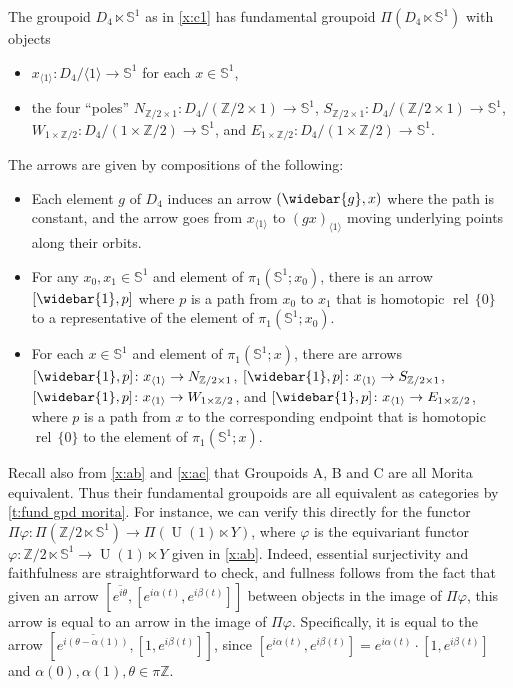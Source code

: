 \documentclass[12pt,reqno]{amsart}
\newcommand{\printname}[1]{}
\renewcommand{\printname}[1]
	{{\color{brown}{\makebox[0pt]{\hspace{-1in}\raisebox{8pt}{\tiny #1}}}}}
\newcommand{\labell}[1]{\label{#1} \printname{#1}}
\renewcommand{\SS}{{\mathbb{S}}} %
\newcommand{\ZZ}{{\mathbb{Z}}}  %
\newcommand{\rel}{{\operatorname{rel}}} %
\newcommand{\U}{{\operatorname{U}}}  %
\theoremstyle{plain}
\theoremstyle{definition}
\newenvironment{example}
		{\pushQED{\qed}\renewcommand{\qedsymbol}{$/\!\!/$}\examplex}
		{\popQED\endexamplex}
\begin{document}
    \begin{example}[{\bf Groupoid C}]\labell{x:c2}
        The groupoid $D_4\ltimes\SS^1$ as in \cref{x:c1} has fundamental groupoid $\Pi(D_4\ltimes\SS^1)$ with objects
        \begin{itemize}
            \item $x_{\langle 1\rangle}\colon D_4/\langle1\rangle\to\SS^1$ for each $x\in\SS^1$, 
            \item the four ``poles'' $N_{\ZZ/2\times 1}\colon D_4/(\ZZ/2\times 1)\to\SS^1$, $S_{\ZZ/2\times 1}\colon D_4/(\ZZ/2\times 1)\to\SS^1$, $W_{1\times\ZZ/2}\colon D_4/(1\times\ZZ/2)\to\SS^1$, and $E_{1\times\ZZ/2}\colon D_4/(1\times\ZZ/2)\to\SS^1$.
        \end{itemize}
        The arrows are given by compositions of the following:
        \begin{itemize}
            \item     Each element $g$ of  $D_4$ induces an arrow  $(\widebar{g}, x)$ where the path is constant, and the arrow goes from $x_{\langle 1\rangle}$ to $(gx)_{\langle 1\rangle}$ moving underlying points along their orbits.    
            \item For any $x_0,x_1\in\SS^1$ and element of $\pi_1(\SS^1;x_0)$, there is an arrow $[\widebar{1},p]$ where $p$ is a path from $x_0$ to $x_1$ that is homotopic $\rel\,\{0\}$ to a representative of the element of $\pi_1(\SS^1;x_0)$.
            \item For each $x\in\SS^1$ and element of $\pi_1(\SS^1;x)$, there are arrows $[\widebar{1},p]\colon x_{\langle1\rangle}\to N_{\ZZ/2\times 1}$, $[\widebar{1},p]\colon x_{\langle1\rangle}\to S_{\ZZ/2\times 1}$, $[\widebar{1},p]\colon x_{\langle1\rangle}\to W_{1\times\ZZ/2}$, and
            $[\widebar{1},p]\colon x_{\langle1\rangle}\to E_{1\times\ZZ/2}$, where $p$ is a path from $x$ to the corresponding endpoint that is homotopic $\rel\,\{0\}$ to the element of $\pi_1(\SS^1;x)$.\qedhere       
        \end{itemize}
    \end{example}
    
    \begin{example}\labell{x:ab pi}
        Recall also from \cref{x:ab} and \cref{x:ac} that Groupoids A, B and C are all Morita equivalent.   Thus their fundamental groupoids are all equivalent as categories by \cref{t:fund gpd morita}.  For instance, we can verify this directly for the functor $\Pi\varphi\colon\Pi(\ZZ/2\ltimes\SS^1)\to\Pi(\U(1)\ltimes Y)$, where $\varphi$ is the equivariant functor $\varphi\colon\ZZ/2\ltimes\SS^1\to\U(1)\ltimes Y$ given in \cref{x:ab}.  Indeed, essential surjectivity and faithfulness are straightforward to check, and fullness follows from the fact that given an arrow $\left[\overline{e^{i\theta}},[e^{i\alpha(t)},e^{i\beta(t)}]\right]$ between objects in the image of $\Pi\varphi$, this arrow is equal to an arrow in the image of $\Pi\varphi$.  Specifically, it is equal to the arrow  $\left[\overline{e^{i(\theta-\alpha(1))}},[1,e^{i\beta(t)}]\right]$,  since $[e^{i\alpha(t)},e^{i\beta(t)}]=e^{i\alpha(t)}\cdot[1,e^{i\beta(t)}]$ and $\alpha(0),\alpha(1),\theta\in\pi\ZZ$.
    \end{example}
       
\end{document}
